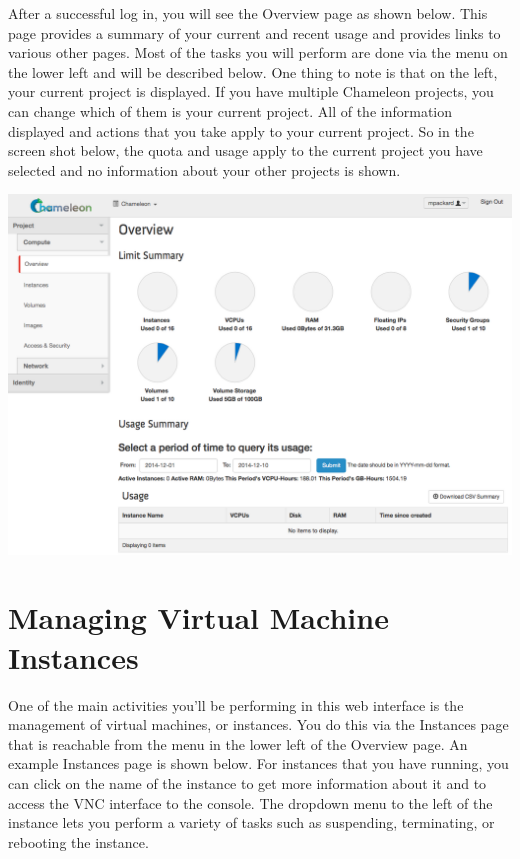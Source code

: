 After a successful log in, you will see the Overview page as shown
below. This page provides a summary of your current and recent usage and
provides links to various other pages. Most of the tasks you will
perform are done via the menu on the lower left and will be described
below. One thing to note is that on the left, your current project is
displayed. If you have multiple Chameleon projects, you can change which
of them is your current project. All of the information displayed and
actions that you take apply to your current project. So in the screen
shot below, the quota and usage apply to the current project you have
selected and no information about your other projects is shown.

\includegraphics[width=\columnwidth]{images/chameleon/openstack_alamo_overview.png}

\section{Managing Virtual Machine
Instances}\label{managing-virtual-machine-instances}

One of the main activities you'll be performing in this web interface is
the management of virtual machines, or instances. You do this via the
Instances page that is reachable from the menu in the lower left of the
Overview page. An example Instances page is shown below. For instances
that you have running, you can click on the name of the instance to get
more information about it and to access the VNC interface to the
console. The dropdown menu to the left of the instance lets you perform
a variety of tasks such as suspending, terminating, or rebooting the
instance.

